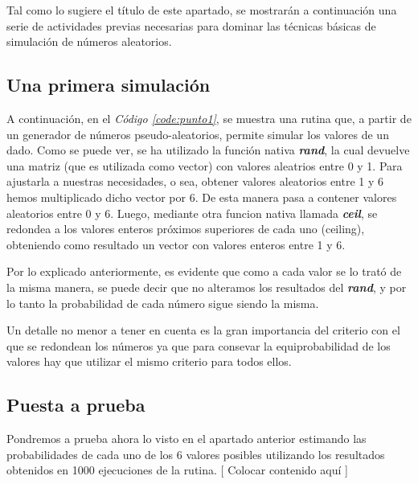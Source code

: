 \documentclass{article}
\newcommand{\refcode}[1]{\textit{Código \ref{#1}}}
\begin{document}
Tal como lo sugiere el título de este apartado, se mostrarán a continuación una serie de actividades previas necesarias para dominar las técnicas básicas de simulación de números aleatorios.


\subsection{Una primera simulación}

A continuación, en el \refcode{code:punto1}, se muestra una rutina que, a partir de un generador de números pseudo-aleatorios, permite simular los valores de un dado. Como se puede ver, se ha utilizado la función nativa \textbf{\textit{rand}}, la cual devuelve una matriz (que es utilizada como vector) con valores aleatrios entre 0 y 1. Para ajustarla a nuestras necesidades, o sea, obtener valores aleatorios entre 1 y 6 hemos multiplicado dicho vector por 6. De esta manera pasa a contener valores aleatorios entre 0 y 6. Luego, mediante otra funcion nativa llamada \textbf{\textit{ceil}}, se redondea a los valores enteros próximos superiores de cada uno (ceiling), obteniendo como resultado un vector con valores enteros entre 1 y 6. 



\medskip
\par
Por lo explicado anteriormente, es evidente que como a cada valor se lo trató de la misma manera, se puede decir que no alteramos los resultados del \textbf{\textit{rand}}, y por lo tanto la probabilidad de cada número sigue siendo la misma.
	\par
	Un detalle no menor a tener en cuenta es la gran importancia del criterio con el que se redondean los números ya que para consevar la equiprobabilidad de los valores hay que utilizar el mismo criterio para todos ellos.

\subsection{Puesta a prueba}

Pondremos a prueba ahora lo visto en el apartado anterior estimando las probabilidades de cada uno de los 6 valores posibles utilizando los resultados obtenidos en 1000 ejecuciones de la rutina. [ Colocar contenido aquí ]
\end{document}
